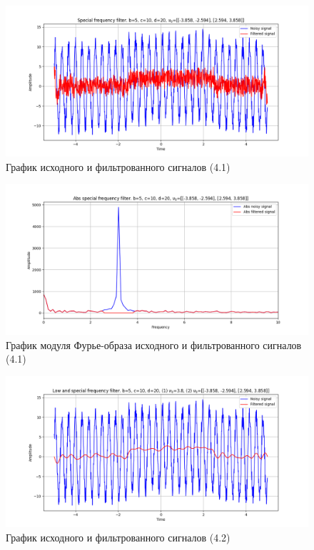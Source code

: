 \documentclass[a4paper, 12pt]{article}
\begin{document}
    \begin{figure}[H]
        \centering
        \includegraphics[scale=0.48]{4_nospec.png}
        \captionsetup{skip=0pt}
        \caption{График исходного и фильтрованного сигналов (4.1)}
        \label{fig:fig71234}
    \end{figure}
    \begin{figure}[H]
        \centering
        \includegraphics[scale=0.48]{4_abs_nospec.png}
        \captionsetup{skip=0pt}
        \caption{График модуля Фурье-образа исходного и фильтрованного сигналов (4.1)}
        \label{fig:fig72234}
    \end{figure}
    \begin{figure}[H]
        \centering
        \includegraphics[scale=0.48]{4_nospec_nohigh.png}
        \captionsetup{skip=0pt}
        \caption{График исходного и фильтрованного сигналов (4.2)}
        \label{fig:fig77234}
    \end{figure}
\end{document}
